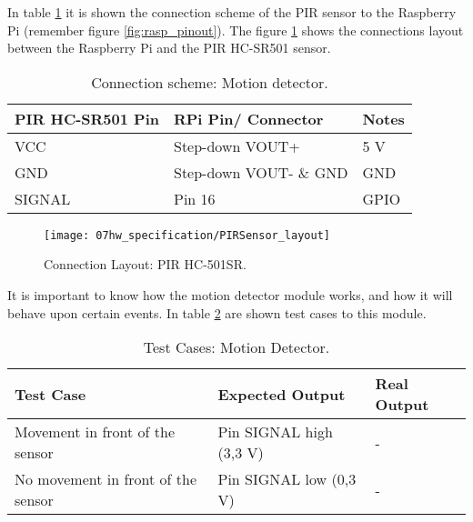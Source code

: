 
In table \ref{table:connect_pir} it is shown the connection scheme of the PIR sensor to the Raspberry Pi (remember figure \ref{fig:rasp_pinout}). The figure \ref{fig:PirLayout} shows the connections layout between the Raspberry Pi and the PIR HC-SR501 sensor.

\begin{table}[H]
	\centering
	\begin{tabular}{|m{4cm}|m{5cm}|m{3cm}|}
		\hline
		\textbf{PIR HC-SR501 Pin} & \textbf{RPi Pin/ Connector} & \textbf{Notes} 
		\\\hline\hline
		VCC & Step-down VOUT+ & 5 V
		\\\hline
		GND & Step-down VOUT- \& GND & GND
		\\\hline
		SIGNAL & Pin 16 & GPIO
		\\\hline
	\end{tabular}
	
	\caption{Connection scheme: Motion detector.}
	\label{table:connect_pir}
\end{table}

\begin{figure}[H]
	\centering
	\texttt{[image: 07hw\_specification/PIRSensor\_layout]}
	\caption{Connection Layout: PIR HC-501SR.}
	\label{fig:PirLayout}
\end{figure}


It is important to know how the motion detector module works, and how it will behave upon certain events. In table \ref{table:test_pir} are shown test cases to this module.

\begin{table}[H]
	\centering
	\resizebox{\columnwidth}{!}
	{
		\begin{tabular}{|m{3cm}|m{5cm}||m{5cm}|}
			\hline
			\textbf{Test Case} & \textbf{Expected Output} & \textbf{Real Output}
			\\\hline\hline
			Movement in front of the sensor & Pin SIGNAL high (3,3 V) & -
			\\\hline
			No movement in front of the sensor & Pin SIGNAL low (0,3 V) & -
			\\\hline
		\end{tabular}
	}
	\caption{Test Cases: Motion Detector.}
	\label{table:test_pir}
\end{table}

\clearpage
